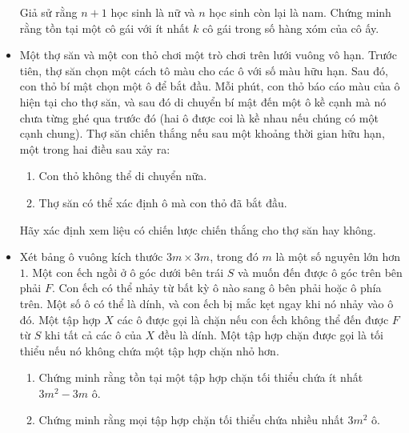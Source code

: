 \documentclass[11pt]{scrartcl}
\begin{document}
\begin{itemize}[label=, leftmargin=0em, itemsep=-0em]
\begin{btvn}
        Giả sử rằng $n+1$ học sinh là nữ và $n$ học sinh còn lại là nam. Chứng minh rằng tồn tại một cô gái với ít nhất $k$ cô gái trong số hàng xóm của cô ấy.
    \end{btvn}

    \item \begin{btvn}
        Một thợ săn và một con thỏ chơi một trò chơi trên lưới vuông vô hạn. Trước tiên, thợ săn chọn một cách tô màu cho các ô với số màu hữu hạn. Sau đó, con thỏ bí mật chọn một ô để bắt đầu. Mỗi phút, con thỏ báo cáo màu của ô hiện tại cho thợ săn, và sau đó di chuyển bí mật đến một ô kề cạnh mà nó chưa từng ghé qua trước đó (hai ô được coi là kề nhau nếu chúng có một cạnh chung). Thợ săn chiến thắng nếu sau một khoảng thời gian hữu hạn, một trong hai điều sau xảy ra:
        \begin{enumerate}
            \item Con thỏ không thể di chuyển nữa.
            \item Thợ săn có thể xác định ô mà con thỏ đã bắt đầu.
        \end{enumerate}
        Hãy xác định xem liệu có chiến lược chiến thắng cho thợ săn hay không.
    \end{btvn}

    \item \begin{btvn}
        Xét bảng ô vuông kích thước $3m\times 3m$, trong đó $m$ là một số nguyên lớn hơn $1.$ Một con ếch ngồi ở ô góc dưới bên trái $S$ và muốn đến được ô góc trên bên phải $F.$ Con ếch có thể nhảy từ bất kỳ ô nào sang ô bên phải hoặc ô phía trên.
        Một số ô có thể là dính, và con ếch bị mắc kẹt ngay khi nó nhảy vào ô đó. Một tập hợp $X$ các ô được gọi là chặn nếu con ếch không thể đến được $F$ từ $S$ khi tất cả các ô của $X$ đều là dính. Một tập hợp chặn được gọi là tối thiểu nếu nó không chứa một tập hợp chặn nhỏ hơn.
        \begin{enumerate}[label=(\alph*)]
            \item Chứng minh rằng tồn tại một tập hợp chặn tối thiểu chứa ít nhất $3m^2-3m$ ô.
            \item Chứng minh rằng mọi tập hợp chặn tối thiểu chứa nhiều nhất $3m^2$ ô.
        \end{enumerate}
    \end{btvn}


\end{itemize}
\end{document}
